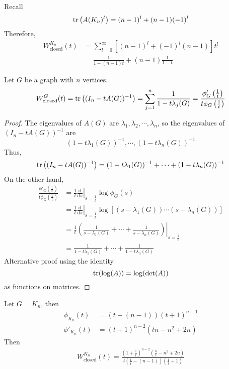 \begin{example}
Recall 
\[ \operatorname*{\mathrm{tr}}\left({A(K_n)^l}\right)=(n-1)^l+(n-1)(-1)^l \]
Therefore,
\begin{align*}
W_\text{closed}^{K_n}(t)&=\sum_{l=0}^\infty\left[(n-1)^l+(-1)^l(n-1)\right]t^l\\
&=\frac{1}{1-(n-1)t}+(n-1)\frac{1}{1-t}
\end{align*}
\end{example}

\begin{theorem}
Let \(G\) be a graph with \(n\) vertices.
\[ W_\text{closed}^G(t)=\operatorname*{\mathrm{tr}}\left((I_n-tA(G))^{-1}\right)=\sum_{j=1}^n\frac{1}{1-t\lambda_j(G)}=\frac{\phi'_G\left(\frac{1}{t}\right)}{t\phi_G\left(\frac{1}{t}\right)} \]
\end{theorem}
\begin{proof}
The eigenvalues of \(A(G)\) are \(\lambda_1,\lambda_2,\cdots,\lambda_n\), so the eigenvalues of \((I_n-tA(G))^{-1}\) are
\[ (1-t\lambda_1(G))^{-1}, \cdots, (1-t\lambda_n(G))^{-1}\]
Thus,
\[ \operatorname*{\mathrm{tr}}\left((I_n-tA(G))^{-1}\right)=(1-t\lambda_1(G))^{-1}+\cdots+(1-t\lambda_n(G))^{-1} \]
On the other hand,
\begin{align*}
\frac{\phi'_G\left(\frac{1}{t}\right)}{t\phi_G\left(\frac{1}{t}\right)}&=
\frac{1}{t}\left.\frac{\mathrm{d}}{\mathrm{d} s}\right|_{s=\frac{1}{t}}\log \phi_G(s)\\
&=\frac{1}{t}\left.\frac{\mathrm{d}}{\mathrm{d} s}\right|_{s=\frac{1}{t}}\log[(s-\lambda_1(G))\cdots(s-\lambda_n(G))]\\
&=\frac{1}{t}\left.\left(\frac{1}{s-\lambda_1(G)}+\cdots+\frac{1}{s-\lambda_n(G)} \right)\right|_{s=\frac{1}{t}}\\
&=\frac{1}{1-t\lambda_1(G)}+\cdots+\frac{1}{1-t\lambda_n(G)}
\end{align*}
Alternative proof using the identity
\[ \operatorname*{\mathrm{tr}}(\log(A))=\log(\det(A)) \]
as functions on matrices.
\end{proof}


\begin{example}
Let \(G=K_n\), then
\begin{align*}
\phi_{K_n}(t)&=(t-(n-1))(t+1)^{n-1}\\
\phi'_{K_n}(t)&=(t+1)^{n-2}(tn-n^2+2n)
\end{align*}
Then
\begin{align*}
W_\text{closed}^{K_n}(t)=\frac{\left(1+\frac{1}{t}\right)^{n-2}\left(\frac{n}{t} -n^2+2n\right)}{t\left(\frac{1}{t}-(n-1)\right)\left(\frac{1}{t}+1\right)}
\end{align*}
\end{example}


